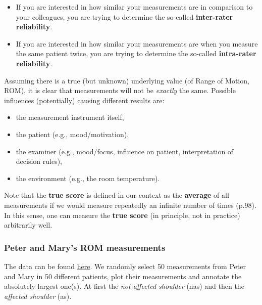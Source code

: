 \documentclass[
]{article}
\providecommand{\tightlist}{%
  \setlength{\itemsep}{0pt}\setlength{\parskip}{0pt}}
\begin{document}
\begin{itemize}
\tightlist
\item
  If you are interested in how
  similar your measurements are in comparison to your colleagues, you are
  trying to determine the so-called \textbf{inter-rater reliability}.
\item
  If you are interested in how similar your measurements are when you measure
  the same patient twice, you are trying to determine the so-called
  \textbf{intra-rater reliability}.
\end{itemize}

Assuming there is a true (but unknown) underlying value (of Range of Motion, ROM),
it is clear that measurements will not be \emph{exactly} the same.
Possible influences (potentially) causing different results are:

\begin{itemize}
\tightlist
\item
  the measurement instrument itself,
\item
  the patient (e.g., mood/motivation),
\item
  the examiner (e.g., mood/focus, influence on patient, interpretation of decision rules),
\item
  the environment (e.g., the room temperature).
\end{itemize}

Note that the \textbf{true score} is defined in our context as the \textbf{average}
of all measurements if we would measure repeatedly an infinite number of times (p.98).
In this sense, one can measure the \textbf{true score} (in principle, not in practice)
arbitrarily well.

\subsubsection{Peter and Mary's ROM measurements}\label{peter-and-marys-rom-measurements}

The data can be found \href{http://www.clinimetrics.nl/answers-to-the-assignments-in-textbook_22_0.html}{here}.
We randomly select 50 measurements from Peter and Mary in 50 different patients,
plot their measurements and annotate the absolutely largest one(s). At first the
\emph{not affected shoulder} (nas) and then the \emph{affected shoulder} (as).
\end{document}
